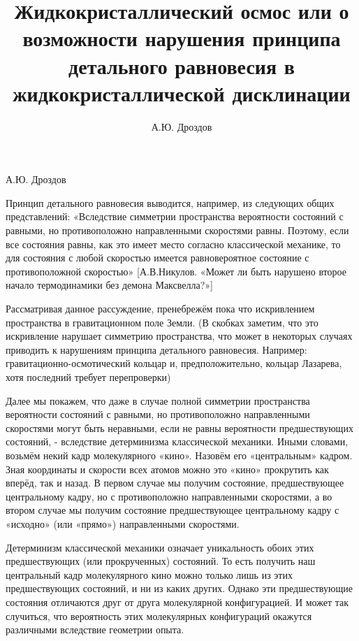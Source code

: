\documentclass[11pt]{article}
\begin{document}
    
\title{Жидкокристаллический осмос
или
о возможности нарушения принципа детального равновесия в
жидкокристаллической
дисклинации}
\author{А.Ю. Дроздов}
\date{}

    \maketitle

    А.Ю. Дроздов

    Принцип детального равновесия выводится, например, из следующих общих
представлений: «Вследствие симметрии пространства вероятности состояний
с равными, но противоположно направленными скоростями равны. Поэтому,
если все состояния равны, как это имеет место согласно классической
механике, то для состояния с любой скоростью имеется равновероятное
состояние с противоположной скоростью» {[}А.В.Никулов. «Может ли быть
нарушено второе начало термодинамики без демона Максвелла?»{]}

    Рассматривая данное рассуждение, пренебрежём пока что искривлением
пространства в гравитационном поле Земли. (В скобках заметим, что это
искривление нарушает симметрию пространства, что может в некоторых
случаях приводить к нарушениям принципа детального равновесия. Например:
гравитационно-осмотический кольцар и, предположительно, кольцар
Лазарева, хотя последний требует перепроверки)

    Далее мы покажем, что даже в случае полной симметрии пространства
вероятности состояний с равными, но противоположно направленными
скоростями могут быть неравными, если не равны вероятности
предшествующих состояний, - вследствие детерминизма классической
механики. Иными словами, возьмём некий кадр молекулярного «кино».
Назовём его «центральным» кадром. Зная координаты и скорости всех атомов
можно это «кино» прокрутить как вперёд, так и назад. В первом случае мы
получим состояние, предшествующее центральному кадру, но с
противоположно направленными скоростями, а во втором случае мы получим
состояние предшествующее центральному кадру с «исходно» (или «прямо»)
направленными скоростями.

    Детерминизм классической механики означает уникальность обоих этих
предшествующих (или прокрученных) состояний. То есть получить наш
центральный кадр молекулярного кино можно только лишь из этих
предшествующих состояний, и ни из каких других. Однако эти
предшествующие состояния отличаются друг от друга молекулярной
конфигурацией. И может так случиться, что вероятность этих молекулярных
конфигураций окажутся различными вследствие геометрии опыта.
\end{document}
